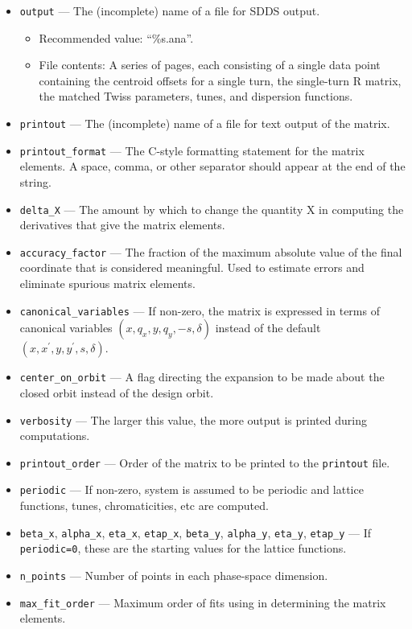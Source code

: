 \documentclass[11pt]{article}
\begin{document}
\begin{itemize}
\item \verb|output| --- The (incomplete) name of a file for SDDS output.
    \begin{itemize}
    \item Recommended value: ``\%s.ana''.
    \item File contents:  A series of pages, each consisting of a single data point containing
        the centroid offsets for a single turn, the single-turn R matrix, the matched Twiss parameters, tunes, and 
        dispersion functions.
    \end{itemize}
\item \verb|printout| --- The (incomplete) name of a file for text output of the matrix.
\item \verb|printout_format| --- The C-style formatting statement for the matrix elements. A space, comma, or other separator
  should appear at the end of the string.
\item \verb|delta_X| --- The amount by which to change the quantity X in computing the derivatives that give the matrix elements.
\item \verb|accuracy_factor| --- The fraction of the maximum absolute value of the final coordinate that is considered meaningful.
  Used to estimate errors and eliminate spurious matrix elements.
\item \verb|canonical_variables| --- If non-zero, the matrix is expressed in terms of canonical variables $(x, q_x, y, q_y, -s, \delta)$
  instead of the default $(x, x^\prime, y, y^\prime, s, \delta)$.
\item \verb|center_on_orbit| --- A flag directing the expansion to be made about the closed orbit instead of the design orbit.
\item \verb|verbosity| --- The larger this value, the more output is printed during computations.
\item \verb|printout_order| --- Order of the matrix to be printed to the \verb|printout| file.
\item \verb|periodic| --- If non-zero, system is assumed to be periodic and lattice functions, tunes, chromaticities, etc are computed.
\item \verb|beta_x|, \verb|alpha_x|, \verb|eta_x|, \verb|etap_x|, \verb|beta_y|, \verb|alpha_y|, \verb|eta_y|, \verb|etap_y| ---
  If \verb|periodic=0|, these are the starting values for the lattice functions.
\item \verb|n_points| --- Number of points in each phase-space dimension.
\item \verb|max_fit_order| --- Maximum order of fits using in determining the matrix elements.
\end{itemize}
\end{document}
